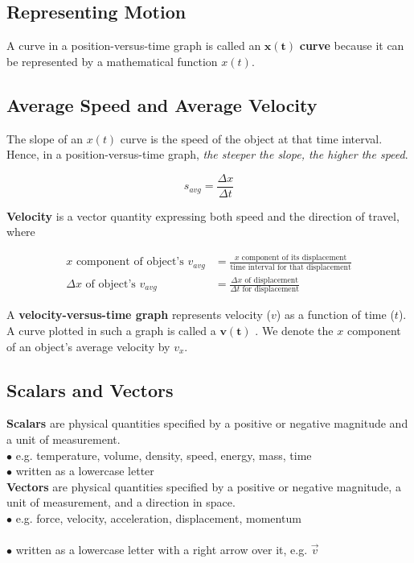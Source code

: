     \subsection{Representing Motion}
        A curve in a position-versus-time graph is called an $\bm{x(t)}$ \textbf{curve} because it can be represented by a mathematical function $x(t)$.



    \subsection{Average Speed and Average Velocity}
        The slope of an $x(t)$ curve is the speed of the object at that time interval. Hence, in a position-versus-time graph, \textit{the steeper the slope, the higher the speed}.

        \[
            s_{avg} = \frac{\Delta x}{\Delta t}
        \]

        \noindent \textbf{Velocity} is a vector quantity expressing both speed and the direction of travel, where

        \begin{align*}
            x\text{ component of object's } v_{avg} &= \frac{x \text{ component of its displacement}}{\text{time interval for that displacement}} \\
            \Delta x \text{ of object's } v_{avg}   &= \frac{\Delta x \text{ of displacement}}{\Delta t \text{ for displacement}}
        \end{align*}

        \noindent A \textbf{velocity-versus-time graph} represents velocity ($v$) as a function of time ($t$). A curve plotted in such a graph is called a $\bm{v(t)}$ . We denote the $x$ component of an
        object's average velocity by $v_x$.




    \subsection{Scalars and Vectors}
        \textbf{Scalars} are physical quantities specified by a positive or negative magnitude and a unit of measurement. \\
        $\bullet$ e.g. temperature, volume, density, speed, energy, mass, time \\
        $\bullet$ written as a lowercase letter \\

        \noindent \textbf{Vectors} are physical quantities specified by a positive or negative magnitude, a unit of measurement, and a direction in space. \\
        $\bullet$ e.g. force, velocity, acceleration, displacement, momentum \\ \\
        $\bullet$ written as a lowercase letter with a right arrow over it, e.g. $\overrightarrow{v}$

